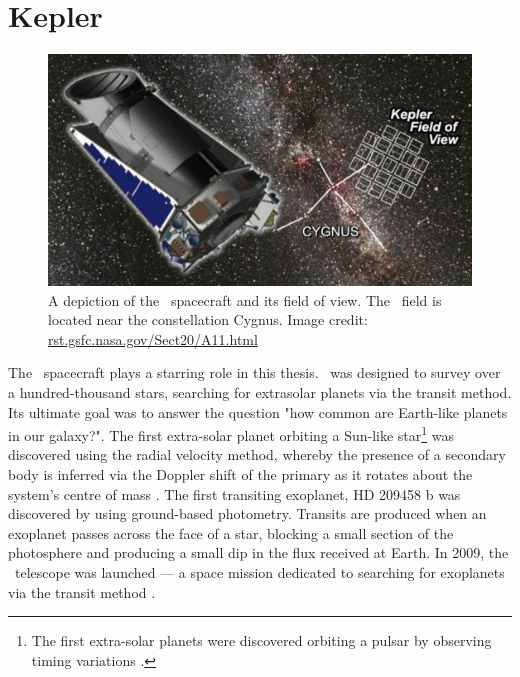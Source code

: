 \section{Kepler}
\label{sec:kepler}

\begin{figure}[p]
\begin{center}
\includegraphics[width=6in, clip=true]{figures/kepler_pic.pdf}
\caption[The \kepler\ spacecraft and its field of view.]
{A depiction of the \kepler\ spacecraft and its field of view.
The \kepler\ field is located near the constellation Cygnus.
Image credit: \url{rst.gsfc.nasa.gov/Sect20/A11.html}}
\label{fig:current_fields}
\end{center}
\end{figure}

The \kepler\ spacecraft plays a starring role in this thesis.
\kepler\ was designed to survey over a hundred-thousand stars, searching for
extrasolar planets via the transit method.
Its ultimate goal was to answer the question "how common are Earth-like
planets in our galaxy?".
The first extra-solar planet orbiting a Sun-like star\footnote{The first
extra-solar planets were discovered orbiting a pulsar by observing
timing variations \citep{Wolszczan1992}.}
was discovered using the radial velocity method, whereby the presence of a
secondary body is inferred via the Doppler shift of the primary as it rotates
about the system's centre of mass \citep{Mayor1995}.
The first transiting exoplanet, HD 209458 b was discovered by
\citet{Charbonneau2000} using ground-based photometry.
Transits are produced when an exoplanet passes across the face of a star,
blocking a small section of the photosphere and producing a small dip in the
flux received at Earth.
In 2009, the \kepler\ telescope was launched --- a space mission dedicated to
searching for exoplanets via the transit method \citep{Borucki2010}.

